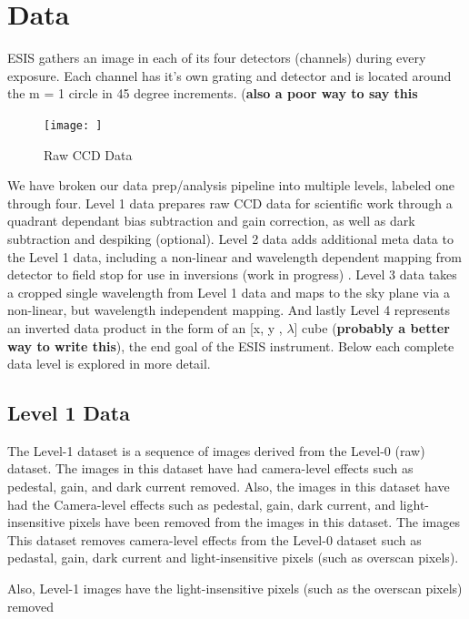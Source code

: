 	
\section{Data}
    ESIS gathers an image in each of its four detectors (channels) during every exposure.  
    Each channel has it's own grating and detector and is located around the m = 1 circle in 45 degree increments. (\textbf{also a poor way to say this}
    
    \begin{figure}
        \centering
        \texttt{[image: ]}
        \caption{Raw CCD Data}
        \label{fig:Level0}
    \end{figure}
    
    We have broken our data prep/analysis pipeline into multiple levels, labeled one through four.
    Level 1 data prepares raw CCD data for scientific work through a quadrant dependant bias subtraction and gain correction, as well as dark subtraction and despiking (optional).
    Level 2 data adds additional meta data to the Level 1 data, including a non-linear and wavelength dependent mapping from detector to field stop for use in inversions (work in progress) .
    Level 3 data takes a cropped single wavelength from Level 1 data and maps to the sky plane via a non-linear, but wavelength independent mapping.
    And lastly Level 4 represents an inverted data product in the form of an [x, y , $\lambda$] cube (\textbf{probably a better way to write this}), the end goal of the ESIS instrument.
    Below each complete data level is explored in more detail.
    
    \subsection{Level 1 Data}
    
        The Level-1 dataset is a sequence of images derived from the Level-0 (raw) dataset.
        The images in this dataset have had camera-level effects such as pedestal, gain, and dark current removed.
        Also, the images in this dataset have had the 
        Camera-level effects such as pedestal, gain, dark current, and light-insensitive pixels have been removed from the images in this dataset.
        The images 
        This dataset removes camera-level effects from the Level-0 dataset such as pedastal, gain, dark current and light-insensitive pixels (such as overscan pixels).
        
        
        Also, Level-1 images have the light-insensitive pixels (such as the overscan pixels) removed 
    
